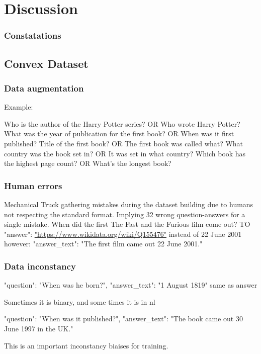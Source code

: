 \chapter{Discussion}
\label{chap:discussion}


\subsection{Constatations}

\section{Convex Dataset}
\subsection{Data augmentation}
Example:

Who is the author of the Harry Potter series? OR Who wrote Harry Potter?
What was the year of publication for the first book? OR When was it first published?
Title of the first book? OR The first book was called what?
What country was the book set in? OR It was set in what country?
Which book has the highest page count? OR What's the longest book?


\subsection{Human errors}
Mechanical Truck gathering mistakes during the dataset building due to humans not respecting the standard format. Implying 32 wrong question-answers for a single mistake.
When did the first The Fast and the Furious film come out?
TO "answer": \url{"https://www.wikidata.org/wiki/Q155476"} instead of 22 June 2001
however: "answer\_text": "The first film came out 22 June 2001."

\subsection{Data inconstancy}
"question": "When was he born?",
"answer\_text": "1 August 1819" same as answer

Sometimes it is binary, and some times it is in \gls{nl}

"question": "When was it published?", 
"answer\_text": "The book came out 30 June 1997 in the UK."

This is an important inconstancy biaises for training.

